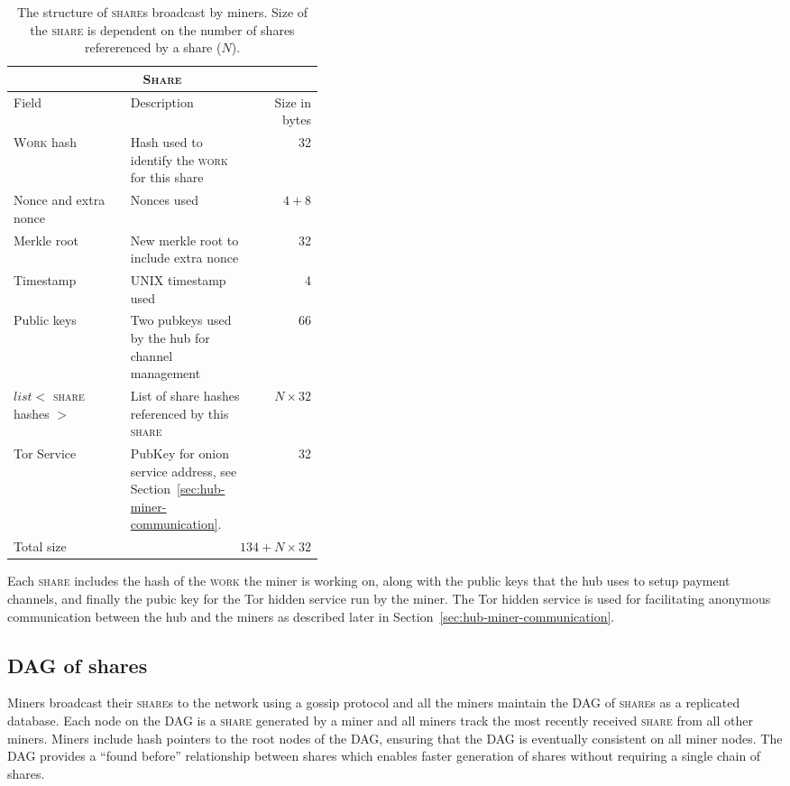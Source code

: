 \documentclass{article}
\begin{document}
\begin{table}
  \centering
  \begin{tabular}{ lp{0.4\linewidth}r }
    \multicolumn{3}{c}{\textsc{Share}} \\
    \hline
    Field & Description & Size in bytes \\
    \hline
    \textsc{Work} hash & Hash used to identify the \textsc{work} for this share & 32 \\
    Nonce and extra nonce & Nonces used & $4+8$ \\
    Merkle root & New merkle root to include extra nonce & 32 \\
    Timestamp & UNIX timestamp used & 4 \\
    Public keys & Two pubkeys used by the hub for channel management & 66 \\
    $list<$ \textsc{share} hashes $>$ & List of share hashes referenced by this \textsc{share} & $N \times 32$ \\
    Tor Service & PubKey for onion service address, see Section~\ref{sec:hub-miner-communication}. & 32 \\
    \hline
    Total size & \multicolumn{2}{r}{$134 + N \times 32$} \\
    \hline
  \end{tabular}
  \caption{The structure of \textsc{share}s broadcast by miners. Size
    of the \textsc{share} is dependent on the number of shares
    refererenced by a share ($N$).}\label{table:share}
\end{table}

Each \textsc{share} includes the hash of the \textsc{work} the miner
is working on, along with the public keys that the hub uses to setup
payment channels, and finally the pubic key for the Tor hidden service
run by the miner. The Tor hidden service is used for facilitating
anonymous communication between the hub and the miners as described
later in Section~\ref{sec:hub-miner-communication}.

\subsection{DAG of shares}

Miners broadcast their \textsc{share}s to the network using a gossip
protocol and all the miners maintain the DAG of \textsc{share}s as a
replicated database. Each node on the DAG is a \textsc{share}
generated by a miner and all miners track the most recently received
\textsc{share} from all other miners. Miners include hash pointers to
the root nodes of the DAG, ensuring that the DAG is eventually
consistent on all miner nodes. The DAG provides a ``found before''
relationship between shares which enables faster generation of shares
without requiring a single chain of shares.
\end{document}
